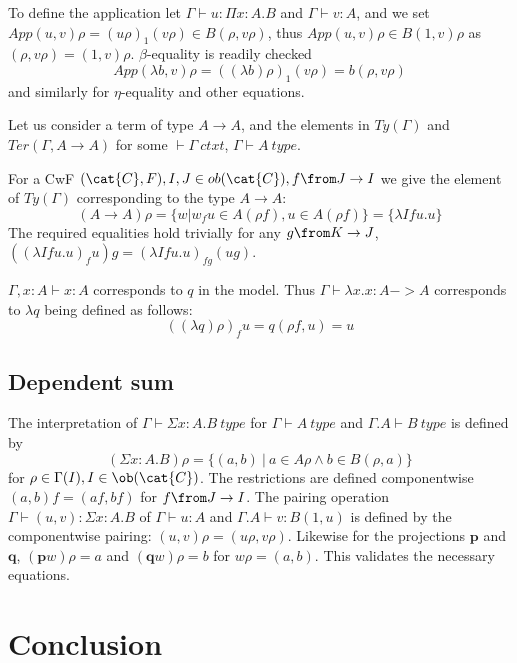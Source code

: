 To define the application let $\Gamma \vdash u : \Pi x:A.B$ and $\Gamma \vdash
v : A$, and we set $App(u, v)\rho = (u\rho)_1 (v\rho) \in B(\rho, v\rho)$, thus
$App(u, v)\rho \in B(1, v)\rho$ as $(\rho, v \rho) = (1, v)\rho$.
$\beta$-equality is readily checked
\[
  App(\lambda b, v)\rho = ((\lambda b)\rho)_1(v\rho)=b(\rho, v\rho)
\]
and similarly for $\eta$-equality and other equations.

\begin{example}
  Let us consider a term of type $A \to A$, and the elements in $Ty(\Gamma)$
  and $Ter(\Gamma, A \to A)$ for some $\vdash \Gamma~ctxt$, $\Gamma \vdash
  A~type$.

  For a CwF $(\cat{C}, F), I, J \in ob(\cat{C}), f \from J \to I$ we give the
  element of $\mathit{Ty}(\Gamma)$ corresponding to the type $A \to A$:
  \[
    (A \to A)\rho = \{w | w_f u \in A(\rho f), u \in A(\rho f)\} = \{\lambda I f u.u\}
  \]
  The required equalities hold trivially for any $g \from K \to J$, $((\lambda
  I f u.u)_f u) g = (\lambda I f u.u)_{fg} (ug)$.

  $\Gamma, x : A \vdash x : A$ corresponds to $q$ in the model. Thus $\Gamma
  \vdash \lambda x.x : A -> A$ corresponds to $\lambda q$ being defined as
  follows:
  \[
    ((\lambda q) \rho)_f u = q(\rho f, u) = u
  \]
\end{example}

\subsection*{Dependent sum}
The interpretation of $\Gamma \vdash \Sigma x:A.B~type$ for $\Gamma \vdash
A~type$ and $\Gamma.A \vdash B~type$ is defined by
\[
  (\Sigma x :A. B)\rho = \{(a, b)~|~a \in A\rho \land b \in B(\rho, a)\}
\]
for $\rho \in \Gamma(I), I \in \ob(\cat{C})$. The restrictions are defined
componentwise $(a, b)f = (af, bf)$ for $f \from J \to I$. The pairing operation
$\Gamma \vdash (u, v) : \Sigma x:A.B$ of $\Gamma \vdash u : A$ and $\Gamma.A
\vdash v : B(1, u)$ is defined by the componentwise pairing: $(u, v)\rho =
(u\rho, v\rho)$. Likewise for the projections $\mathbf{p}$ and $\mathbf{q}$,
$(\mathbf{p}w)\rho = a$ and $(\mathbf{q}w)\rho = b$ for $w\rho = (a, b)$. This
validates the necessary equations.

\section*{Conclusion}



